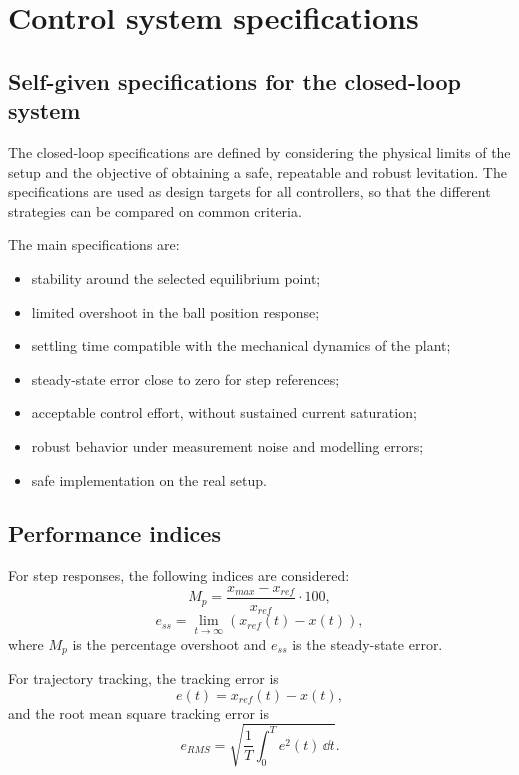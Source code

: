 \section{Control system specifications}

\subsection{Self-given specifications for the closed-loop system}

The closed-loop specifications are defined by considering the physical limits of the setup and the objective of obtaining a safe, repeatable and robust levitation. The specifications are used as design targets for all controllers, so that the different strategies can be compared on common criteria.

The main specifications are:
\begin{itemize}[leftmargin=1.2cm]
    \item stability around the selected equilibrium point;
    \item limited overshoot in the ball position response;
    \item settling time compatible with the mechanical dynamics of the plant;
    \item steady-state error close to zero for step references;
    \item acceptable control effort, without sustained current saturation;
    \item robust behavior under measurement noise and modelling errors;
    \item safe implementation on the real setup.
\end{itemize}

\subsection{Performance indices}

For step responses, the following indices are considered:
\begin{equation}
    M_p = \frac{x_{max}-x_{ref}}{x_{ref}}\cdot 100,
\end{equation}
\begin{equation}
    e_{ss} = \lim_{t\to\infty} \left(x_{ref}(t)-x(t)\right),
\end{equation}
where $M_p$ is the percentage overshoot and $e_{ss}$ is the steady-state error.

For trajectory tracking, the tracking error is
\begin{equation}
    e(t) = x_{ref}(t)-x(t),
\end{equation}
and the root mean square tracking error is
\begin{equation}
    e_{RMS} = \sqrt{\frac{1}{T}\int_0^T e^2(t)\,\dd t}.
\end{equation}


